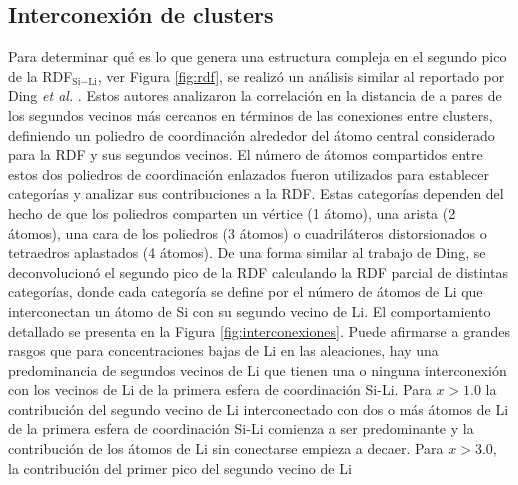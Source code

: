\subsection{Interconexión de clusters}\label{s:interconexion}

Para determinar qué es lo que genera una estructura compleja en el segundo pico de la 
RDF$_{\text{Si}-\text{Li}}$, ver Figura \ref{fig:rdf}, se realizó un análisis similar al reportado por Ding \textit{et al.}
\cite{ding2015}. Estos autores analizaron la correlación en la distancia de a
pares de los segundos vecinos más cercanos en términos de las conexiones entre
clusters, definiendo un poliedro de coordinación alrededor del átomo central 
considerado para la RDF y sus segundos vecinos. El número de átomos compartidos
entre estos dos poliedros de coordinación enlazados fueron utilizados para 
establecer categorías y analizar sus contribuciones a la RDF. Estas categorías
dependen del hecho de que los poliedros comparten un vértice (1 átomo), una 
arista (2 átomos), una cara de los poliedros (3 átomos) o cuadriláteros 
distorsionados o tetraedros aplastados (4 átomos). De una forma similar al trabajo de Ding, se deconvolucionó el segundo pico de la RDF calculando la RDF parcial 
de distintas categorías, donde cada categoría se define por el número de átomos de
Li que interconectan un átomo de Si con su segundo vecino de Li. El comportamiento
detallado se presenta en la Figura \ref{fig:interconexiones}. Puede afirmarse a 
grandes rasgos que para concentraciones bajas de Li en las aleaciones, hay una 
predominancia de segundos vecinos de Li que tienen una o ninguna interconexión 
con los vecinos de Li de la primera esfera de coordinación Si-Li. Para $x > 1.0$
la contribución del segundo vecino de Li interconectado con dos o más átomos de 
Li de la primera esfera de coordinación Si-Li comienza a ser predominante y la
contribución de los átomos de Li sin conectarse empieza a decaer. Para $x > 3.0$,
la contribución del primer pico del segundo vecino de Li 
